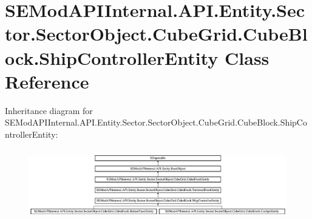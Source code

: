 \hypertarget{class_s_e_mod_a_p_i_internal_1_1_a_p_i_1_1_entity_1_1_sector_1_1_sector_object_1_1_cube_grid_1_1fd05c9636f75dd22094d44c0d12591d7}{}\section{S\+E\+Mod\+A\+P\+I\+Internal.\+A\+P\+I.\+Entity.\+Sector.\+Sector\+Object.\+Cube\+Grid.\+Cube\+Block.\+Ship\+Controller\+Entity Class Reference}
\label{class_s_e_mod_a_p_i_internal_1_1_a_p_i_1_1_entity_1_1_sector_1_1_sector_object_1_1_cube_grid_1_1fd05c9636f75dd22094d44c0d12591d7}
Inheritance diagram for S\+E\+Mod\+A\+P\+I\+Internal.\+A\+P\+I.\+Entity.\+Sector.\+Sector\+Object.\+Cube\+Grid.\+Cube\+Block.\+Ship\+Controller\+Entity\+:\begin{figure}[H]
\begin{center}
\leavevmode
\includegraphics[height=3.111111cm]{class_s_e_mod_a_p_i_internal_1_1_a_p_i_1_1_entity_1_1_sector_1_1_sector_object_1_1_cube_grid_1_1fd05c9636f75dd22094d44c0d12591d7}
\end{center}
\end{figure}
